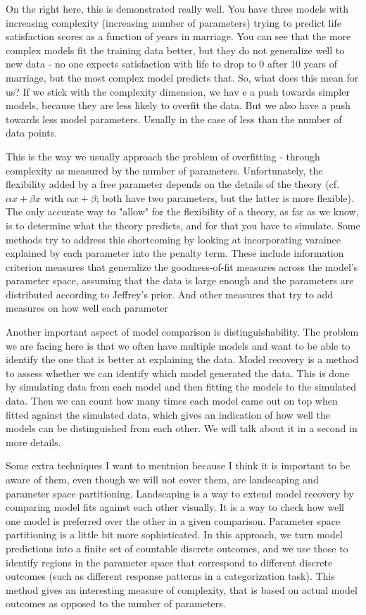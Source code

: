 \documentclass[12pt]{article}
\begin{document}
On the right here, this is demonstrated really well. You have three models with increasing complexity (increasing number of parameters) trying to predict life satisfaction scores as a function of years in marriage. You can see that the more complex models fit the training data better, but they do not generalize well to new data - no one expects satisfaction with life to drop to 0 after 10 years of marriage, but the most complex model predicts that. So, what does this mean for us? If we stick with the complexity dimension, we hav e a push towards simpler models, because they are less likely to overfit the data. But we also have a push towards less model parameters. Usually in the case of less than the number of data points.

This is the way we usually approach the problem of overfitting - through complexity as measured by the number of parameters. Unfortunately, the flexibility added by a free parameter depends on the details of the theory (cf. $\alpha x + \beta x$ with $\alpha x + \beta$; both have two parameters, but the latter is more flexible). The only accurate way to "allow" for the flexibility of a theory, as far as we know, is to determine what the theory predicts, and for that you have to simulate. Some methods try to address this shortcoming by looking at incorporating varaince explained by each parameter into the penalty term. These include information criterion measures that generalize the goodness-of-fit measures across the model's parameter space, assuming that the data is large enough and the parameters are distributed according to Jeffrey's prior. And other measures that try to add measures on how well each parameter 

Another important aspect of model comparison is distinguishability. The problem we are facing here is that we often have multiple models and want to be able to identify the one that is better at explaining the data. Model recovery is a method to assess whether we can identify which model generated the data. This is done by simulating data from each model and then fitting the models to the simulated data. Then we can count how many times each model came out on top when fitted against the simulated data, which gives an indication of how well the models can be distinguished from each other. We will talk about it in a second in more details.

Some extra techniques I want to mentnion because I think it is important to be aware of them, even though we will not cover them, are landscaping and parameter space partitioning. Landscaping is a way to extend model recovery by comparing model fits against each other visually. It is a way to check how well one model is preferred over the other in a given comparison. Parameter space partitioning is a little bit more sophisticated. In this approach, we turn model predictions into a finite set of countable discrete outcomes, and we use those to identify regions in the parameter space that correspond to different discrete outcomes (such as different response patterns in a categorization task). This method gives an interesting measure of complexity, that is based on actual model outcomes as opposed to the number of parameters.
\end{document}
